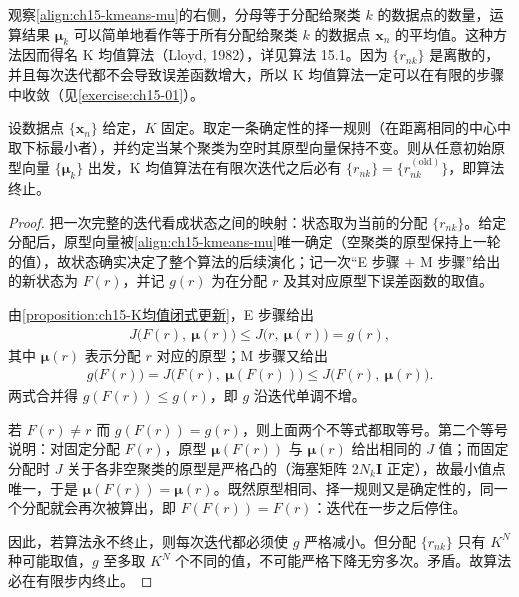 \documentclass[../../main.tex]{subfiles}
\begin{document}
观察\eqref{align:ch15-kmeans-mu}的右侧，分母等于分配给聚类 $k$ 的数据点的数量，运算结果 $\bm{\mu}_k$ 可以简单地看作等于所有分配给聚类 $k$ 的数据点 $\bm{x}_n$ 的平均值。这种方法因而得名 K 均值算法（Lloyd, 1982），详见算法 15.1。因为 $\{r_{nk}\}$ 是离散的，并且每次迭代都不会导致误差函数增大，所以 K 均值算法一定可以在有限的步骤中收敛（见\cref{exercise:ch15-01}）。

\begin{theorem}[K 均值算法的有限步终止]\label{theorem:ch15-K均值收敛}
设数据点 $\{\bm{x}_n\}$ 给定，$K$ 固定。取定一条确定性的择一规则（在距离相同的中心中取下标最小者），并约定当某个聚类为空时其原型向量保持不变。则从任意初始原型向量 $\{\bm{\mu}_k\}$ 出发，K 均值算法在有限次迭代之后必有 $\{r_{nk}\}=\{r_{nk}^{(\text{old})}\}$，即算法终止。
\end{theorem}
\begin{proof}
把一次完整的迭代看成状态之间的映射：状态取为当前的分配 $\{r_{nk}\}$。给定分配后，原型向量被\eqref{align:ch15-kmeans-mu}唯一确定（空聚类的原型保持上一轮的值），故状态确实决定了整个算法的后续演化；记一次“E 步骤 + M 步骤”给出的新状态为 $F(r)$，并记 $g(r)$ 为在分配 $r$ 及其对应原型下误差函数的取值。

由\cref{proposition:ch15-K均值闭式更新}，E 步骤给出
\begin{align*}
J\big(F(r),\ \bm{\mu}(r)\big)\leqslant J\big(r,\ \bm{\mu}(r)\big)=g(r),
\end{align*}
其中 $\bm{\mu}(r)$ 表示分配 $r$ 对应的原型；M 步骤又给出
\begin{align*}
g\big(F(r)\big)=J\big(F(r),\ \bm{\mu}(F(r))\big)\leqslant J\big(F(r),\ \bm{\mu}(r)\big).
\end{align*}
两式合并得 $g(F(r))\leqslant g(r)$，即 $g$ 沿迭代单调不增。

若 $F(r)\neq r$ 而 $g(F(r))=g(r)$，则上面两个不等式都取等号。第二个等号说明：对固定分配 $F(r)$，原型 $\bm{\mu}(F(r))$ 与 $\bm{\mu}(r)$ 给出相同的 $J$ 值；而固定分配时 $J$ 关于各非空聚类的原型是严格凸的（海塞矩阵 $2N_k\bm{I}$ 正定），故最小值点唯一，于是 $\bm{\mu}(F(r))=\bm{\mu}(r)$。既然原型相同、择一规则又是确定性的，同一个分配就会再次被算出，即 $F(F(r))=F(r)$：迭代在一步之后停住。

因此，若算法永不终止，则每次迭代都必须使 $g$ 严格减小。但分配 $\{r_{nk}\}$ 只有 $K^{N}$ 种可能取值，$g$ 至多取 $K^{N}$ 个不同的值，不可能严格下降无穷多次。矛盾。故算法必在有限步内终止。
\end{proof}
\end{document}
